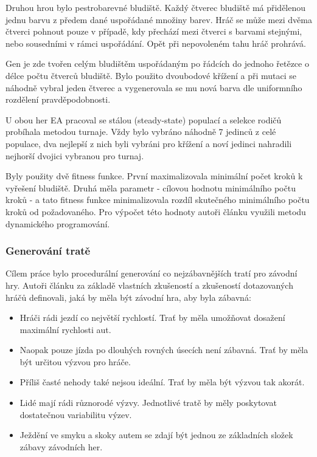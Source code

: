 Druhou hrou bylo pestrobarevné bludiště. Každý čtverec bludiště má přidělenou jednu barvu z předem dané uspořádané množiny barev. Hráč se může mezi dvěma čtverci pohnout pouze v případě, kdy přechází mezi čtverci s barvami stejnými, nebo sousedními v rámci uspořádání. Opět při nepovoleném tahu hráč prohrává.

Gen je zde tvořen celým bludištěm uspořádaným po řádcích do jednoho řetězce o délce počtu čtverců bludiště. Bylo použito dvoubodové křížení a při mutaci se náhodně vybral jeden čtverec a vygenerovala se mu nová barva dle uniformního rozdělení pravděpodobnosti.

U obou her EA pracoval se stálou (steady-state) populací a selekce rodičů probíhala metodou turnaje. Vždy bylo vybráno náhodně 7 jedinců z celé populace, dva nejlepší z nich byli vybráni pro křížení a noví jedinci nahradili nejhorší dvojici vybranou pro turnaj.

Byly použity dvě fitness funkce. První maximalizovala minimální počet kroků k vyřešení bludiště. Druhá měla parametr - cílovou hodnotu minimálního počtu kroků - a tato fitness funkce minimalizovala rozdíl skutečného minimálního počtu kroků od požadovaného. Pro výpočet této hodnoty autoři článku využili metodu dynamického programování.

\subsubsection{Generování tratě}

Cílem práce \cite{EvolTrack} bylo procedurální generování co nejzábavnějších tratí pro závodní hry. Autoři článku za základě vlastních zkušeností a zkušeností dotazovaných hráčů definovali, jaká by měla být závodní hra, aby byla zábavná:


\begin{itemize}
	\item Hráči rádi jezdí co největší rychlostí. Trať by měla umožňovat dosažení maximální rychlosti aut.
	\item Naopak pouze jízda po dlouhých rovných úsecích není zábavná. Trať by měla být určitou výzvou pro hráče.
	\item Příliš časté nehody také nejsou ideální. Trať by měla být výzvou tak akorát.
	\item Lidé mají rádi různorodé výzvy. Jednotlivé tratě by měly poskytovat dostatečnou variabilitu výzev.
	\item Ježdění ve smyku a skoky autem se zdají být jednou ze základních složek zábavy závodních her.
\end{itemize}

